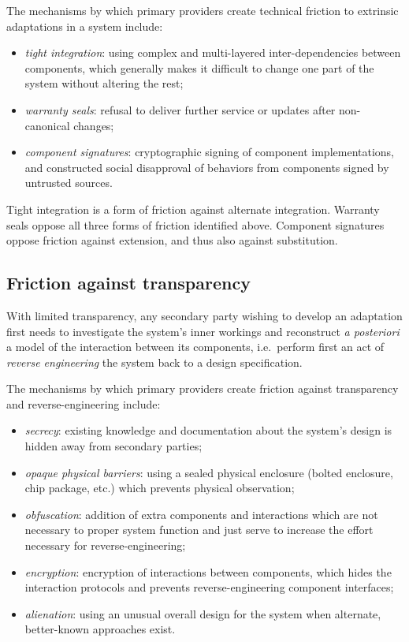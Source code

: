\documentclass[a4paper]{article}
\newcommand{\ie}{i.e.~}
\begin{document}
The mechanisms by which primary providers create technical friction to
extrinsic adaptations in a system include:
\begin{itemize}
\item \emph{tight integration}: using complex and
  multi-layered inter-dependencies between components, which generally
  makes it difficult to change one part of the system without altering
  the rest;
\item \emph{warranty seals}: refusal to deliver further service or updates
  after non-canonical changes;
\item \emph{component signatures}: cryptographic signing of component
  implementations, and constructed social disapproval of behaviors from
  components signed by untrusted sources.
\end{itemize}

Tight integration is a form of friction against alternate
integration. Warranty seals oppose all three forms of friction
identified above. Component signatures oppose friction against
extension, and thus also against substitution.

\subsection{Friction against transparency}\label{sec:transf}

With limited transparency, any secondary party wishing to develop an
adaptation first needs to investigate the system's inner workings and
reconstruct \textsl{a posteriori} a model of the interaction between
its components, \ie perform first an act of \emph{reverse engineering}
the system back to a design specification.

The mechanisms by which primary providers create friction against
transparency and reverse-engineering include:
\begin{itemize}
\item \emph{secrecy}: existing knowledge and documentation about the system's
  design is hidden away from secondary parties;
\item \emph{opaque physical barriers}: using a sealed physical
  enclosure (bolted enclosure,
  chip package, etc.) which prevents physical observation;
\item \emph{obfuscation}: addition of extra components
  and interactions which are not necessary to proper system function
  and just serve to increase the effort necessary for
  reverse-engineering;
\item \emph{encryption}: encryption of interactions
  between components, which hides the interaction protocols and
  prevents reverse-engineering component interfaces;
\item \emph{alienation}: using an unusual overall design for the system
  when alternate, better-known approaches exist.
\end{itemize}
\end{document}
